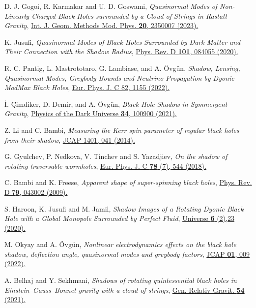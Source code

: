 \documentclass[aps,amsmath,amssymb,showpacs,showkeys]{revtex4}
\begin{document}
\begin{thebibliography}{99}
D. J. Gogoi, R. Karmakar and U. D. Goswami, {\it Quasinormal Modes of Non-Linearly Charged Black Holes surrounded by a Cloud of Strings in Rastall Gravity}, \href{https://doi.org/10.1142/S021988782350007X}{Int. J. Geom. Methods Mod. Phys. {\bf 20}, 2350007 (2023).}



K. Jusufi, \textit{Quasinormal Modes of Black Holes Surrounded by Dark Matter and Their Connection with the Shadow Radius}, \href{https://doi.org/10.1103/PhysRevD.101.084055}{Phys. Rev. D \textbf{101}, 084055 (2020).}

 R. C. Pantig, L. Mastrototaro, G. Lambiase, and A. \"Ovg\"un, {\it Shadow, Lensing, Quasinormal Modes, Greybody Bounds and Neutrino Propagation by Dyonic ModMax Black Holes}, \href{10.1140/epjc/s10052-022-11125-y}{Eur. Phys. J. C 82, 1155 (2022).}


 {\.I}. {\c C}imdiker, D. Demir, and A. \"Ovg\"un, {\it Black Hole Shadow in Symmergent Gravity}, \href{
https://doi.org/10.1016/j.dark.2021.100900}{Physics of the Dark Universe {\bf 34}, 100900 (2021).}


Z. Li and C. Bambi, \textit{Measuring the Kerr spin parameter of regular black holes from their shadow}, \href{https://doi.org/10.1103/PhysRevD.80.024042}{JCAP 1401, 041 (2014).}

G. Gyulchev, P. Nedkova, V. Tinchev and S. Yazadjiev, \textit{On the shadow of rotating traversable wormholes}, \href{https://link.springer.com/article/10.1140/epjc/s10052-018-6012-9}{Eur. Phys. J. C \textbf{78} (7), 544 (2018).}

C. Bambi and K. Freese, \textit{Apparent shape of super-spinning black holes}, \href{https://doi.org/10.1103/PhysRevD.79.043002}{Phys. Rev. D 7\textbf{9}, 043002 (2009).}


S. Haroon, K. Jusufi and M. Jamil, \textit{Shadow Images of a Rotating Dyonic Black Hole with a Global Monopole Surrounded by Perfect Fluid}, \href{https://www.mdpi.com/2218-1997/6/2/23}{Universe \textbf{6} (2),23 (2020).}

M. Okyay and A. \"{O}vg\"{u}n, \textit{Nonlinear electrodynamics effects on the black hole shadow, deflection angle, quasinormal modes and greybody factors}, \href{https://iopscience.iop.org/article/10.1088/1475-7516/2022/01/009}{JCAP \textbf{01}, 009 (2022).}

A. Belhaj and Y. Sekhmani, \textit{Shadows of rotating quintessential black holes in Einstein–Gauss–Bonnet gravity with a cloud of strings}, \href{https://link.springer.com/article/10.1007/s10714-022-02902-x}{Gen. Relativ Gravit. \textbf{54} (2021).}


\end{thebibliography}
\end{document}
